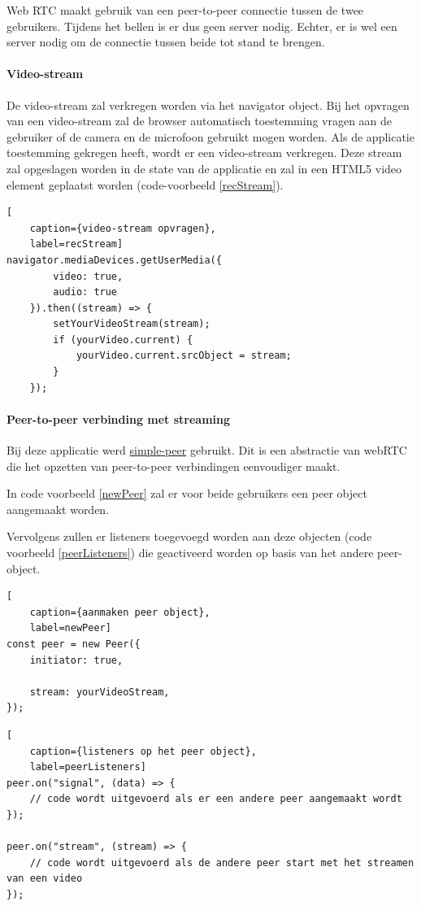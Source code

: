 		Web RTC maakt gebruik van een peer-to-peer connectie tussen de twee gebruikers. Tijdens het bellen is er dus geen server nodig. Echter, er is wel een server nodig om de connectie tussen beide tot stand te brengen.
		
		\paragraph{Video-stream}
			De video-stream zal verkregen worden via het navigator object. Bij het opvragen van een video-stream zal de browser automatisch toestemming vragen aan de gebruiker of de camera en de microfoon gebruikt mogen worden.
			Als de applicatie toestemming gekregen heeft, wordt er een video-stream verkregen.
			Deze stream zal opgeslagen worden in de state van de applicatie en zal in een HTML5 video element geplaatst worden (code-voorbeeld \ref{recStream}).
		
\begin{lstlisting}[
	caption={video-stream opvragen},
	label=recStream]
navigator.mediaDevices.getUserMedia({ 
		video: true,
		audio: true 
	}).then((stream) => {
		setYourVideoStream(stream);
		if (yourVideo.current) {
			yourVideo.current.srcObject = stream;
		}
	});
\end{lstlisting}


		\paragraph{Peer-to-peer verbinding met streaming}
			Bij deze applicatie werd \href{https://github.com/feross/simple-peer}{simple-peer} gebruikt. Dit is een abstractie van webRTC die het opzetten van peer-to-peer verbindingen eenvoudiger maakt.
			
			In code voorbeeld \ref{newPeer} zal er voor beide gebruikers een peer object aangemaakt worden.

			Vervolgens zullen er listeners toegevoegd worden aan deze objecten (code voorbeeld \ref{peerListeners}) die geactiveerd worden op basis van het andere peer-object.
			
\begin{lstlisting}[
	caption={aanmaken peer object},
	label=newPeer]
const peer = new Peer({
	initiator: true,

	stream: yourVideoStream,
});
\end{lstlisting}
						
			
\begin{lstlisting}[
	caption={listeners op het peer object},
	label=peerListeners]
peer.on("signal", (data) => {
	// code wordt uitgevoerd als er een andere peer aangemaakt wordt
});

peer.on("stream", (stream) => {
	// code wordt uitgevoerd als de andere peer start met het streamen van een video
});
\end{lstlisting}

